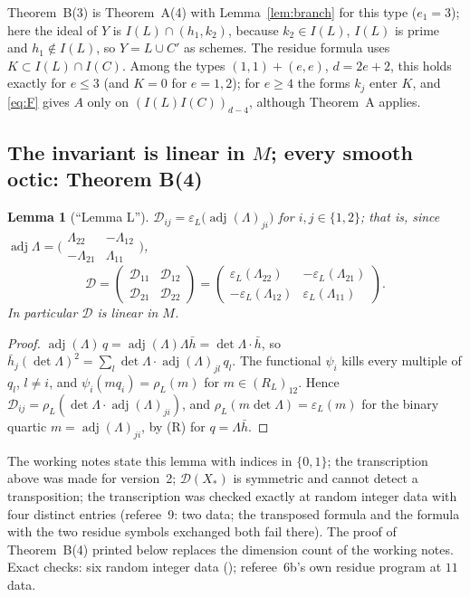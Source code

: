 \documentclass[11pt]{article}
\numberwithin{equation}{section}
\newtheorem{lemma}[theorem]{Lemma}
\theoremstyle{remark}
\newcommand{\cD}{\mathcal{D}}
\newcommand{\adj}{\operatorname{adj}}
\begin{document}
Theorem~B(3) is Theorem~A(4) with Lemma~\ref{lem:branch} for this type ($e_1=3$); here the ideal of $Y$ is
$I(L)\cap(h_1,k_2)$, because $k_2\in I(L)$, $I(L)$ is prime and $h_1\notin I(L)$, so $Y=L\cup C'$ as schemes. The
residue formula uses $K\subset I(L)\cap I(C)$. Among the types $(1,1)+(e,e)$, $d=2e+2$, this holds exactly for
$e\le3$ (and $K=0$ for $e=1,2$); for $e\ge4$ the forms $k_j$ enter $K$, and \eqref{eq:F} gives $A$ only on
$(I(L)I(C))_{d-4}$, although Theorem~A applies.

\subsection{The invariant is linear in \texorpdfstring{$M$}{M}; every smooth octic: Theorem B(4)}\label{ss:every}

\begin{lemma}[``Lemma L'']\label{lem:L}
$\cD_{ij}=\varepsilon_L\bigl(\adj(\Lambda)_{ji}\bigr)$ for $i,j\in\{1,2\}$; that is, since
$\adj\Lambda=\bigl(\begin{smallmatrix}\Lambda_{22}&-\Lambda_{12}\\-\Lambda_{21}&\Lambda_{11}\end{smallmatrix}\bigr)$,
\[
\cD=\begin{pmatrix}\cD_{11}&\cD_{12}\\\cD_{21}&\cD_{22}\end{pmatrix}
=\begin{pmatrix}\varepsilon_L(\Lambda_{22})&-\varepsilon_L(\Lambda_{21})\\
-\varepsilon_L(\Lambda_{12})&\varepsilon_L(\Lambda_{11})\end{pmatrix}.
\]
In particular $\cD$ is linear in $M$.
\end{lemma}
\begin{proof}
$\adj(\Lambda)\,q=\adj(\Lambda)\Lambda\bar h=\det\Lambda\cdot\bar h$, so
$\bar h_j(\det\Lambda)^2=\sum_l\det\Lambda\cdot\adj(\Lambda)_{jl}\,q_l$. The functional $\psi_i$ kills every
multiple of $q_l$, $l\neq i$, and $\psi_i(mq_i)=\rho_L(m)$ for $m\in(R_L)_{12}$. Hence
$\cD_{ij}=\rho_L(\det\Lambda\cdot\adj(\Lambda)_{ji})$, and $\rho_L(m\det\Lambda)=\varepsilon_L(m)$ for the binary
quartic $m=\adj(\Lambda)_{ji}$, by (R) for $q=\Lambda\bar h$.
\end{proof}
The working notes state this lemma with indices in $\{0,1\}$; the transcription above was made for
version~2; $\cD(X_*)$ is symmetric and cannot detect a transposition; the transcription was checked exactly at
random integer data with four distinct entries (referee~9: two data; the transposed formula and the formula with
the two residue symbols exchanged both fail there). The proof of Theorem~B(4) printed below replaces the
dimension count of the working notes. Exact checks:
six random integer data (); referee~6b's own residue program at $11$ data.
\end{document}
